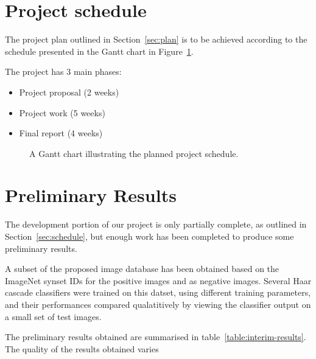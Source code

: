 \documentclass[11pt]{scrartcl}
\begin{document}
	\section{Project schedule} {
    \label{sec:schedule}

        The project plan outlined in Section~\ref{sec:plan} is to be achieved
        according to the schedule presented in the Gantt chart in
        Figure~\ref{gantt:proposal}.

        The project has 3 main phases:
        
        \begin{itemize}
        	\item Project proposal (2 weeks)
        	\item Project work (5 weeks)
        	\item Final report (4 weeks)
        \end{itemize}


		\begin{figure}[H]
	        \makebox[\textwidth][c]{\resizebox{0.95\paperwidth}{!}{}}
			\caption[Project Schedule] {
                A Gantt chart illustrating the planned project schedule.
			}
			\label{gantt:proposal}
		\end{figure}
	}

    \section{Preliminary Results} {
    \label{sec:results}

        The development portion of our project is only partially complete, as outlined in Section~\ref{sec:schedule}, but enough work has been completed to produce some preliminary results.

        A subset of the proposed image database has been obtained based on the ImageNet synset IDs  for the positive images and  as negative images.
        Several Haar cascade classifiers were trained on this datset, using different training parameters, and their performances compared qualatitively by viewing the classifier output on a small set of test images.

        The preliminary results obtained are summarised in table~\ref{table:interim-results}.
        The quality of the results obtained varies 



    }
\end{document}
